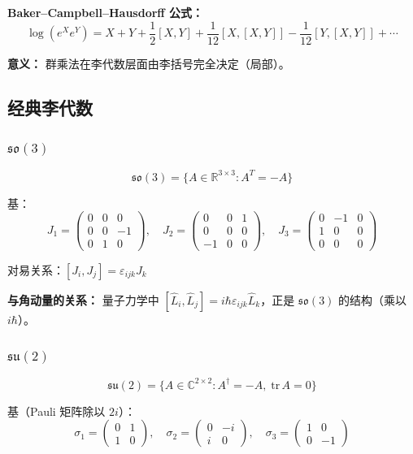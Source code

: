 \textbf{Baker--Campbell--Hausdorff 公式：}
\[
\log(e^X e^Y) = X + Y + \frac{1}{2}[X,Y] + \frac{1}{12}[X,[X,Y]] - \frac{1}{12}[Y,[X,Y]] + \cdots
\]

\textbf{意义：} 群乘法在李代数层面由李括号完全决定（局部）。

\subsection{经典李代数}

\subsubsection{$\mathfrak{so}(3)$}

\[
\mathfrak{so}(3) = \{A \in \mathbb{R}^{3\times 3} : A^T = -A\}
\]

基：
\[
J_1 = \begin{pmatrix} 0&0&0\\0&0&-1\\0&1&0 \end{pmatrix}, \quad
J_2 = \begin{pmatrix} 0&0&1\\0&0&0\\-1&0&0 \end{pmatrix}, \quad
J_3 = \begin{pmatrix} 0&-1&0\\1&0&0\\0&0&0 \end{pmatrix}
\]

对易关系：$[J_i, J_j] = \varepsilon_{ijk}J_k$

\textbf{与角动量的关系：} 量子力学中 $[\hat{L}_i, \hat{L}_j] = i\hbar\varepsilon_{ijk}\hat{L}_k$，正是 $\mathfrak{so}(3)$ 的结构（乘以 $i\hbar$）。

\subsubsection{$\mathfrak{su}(2)$}

\[
\mathfrak{su}(2) = \{A \in \mathbb{C}^{2\times 2} : A^\dagger = -A,\; \text{tr}\,A = 0\}
\]

基（Pauli 矩阵除以 $2i$）：
\[
\sigma_1 = \begin{pmatrix}0&1\\1&0\end{pmatrix}, \quad
\sigma_2 = \begin{pmatrix}0&-i\\i&0\end{pmatrix}, \quad
\sigma_3 = \begin{pmatrix}1&0\\0&-1\end{pmatrix}
\]

